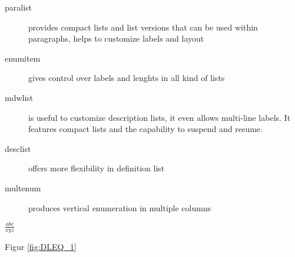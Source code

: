 \documentclass{article}
\begin{document}
\begin{description}
  \item[paralist] provides compact lists and list versions
    that can be used within paragraphs, helps to customize
    labels and layout
  \item[enumitem] gives control over labels and lenghts in all
    kind of lists
  \item[mdwlist] is useful to customize description lists,
    it even allows multi-line labels. It features compact lists
    and the capability to suspend and resume.
  \item[desclist] offers more flexibility in definition list
  \item[multenum] produces vertical enumeration in
    multiple columns
\end{description}


\begin{math}
\frac{abc}{xyz}
 \end{math}    
 

Figur \ref{fig:DLEQ_1}


\end{document}
